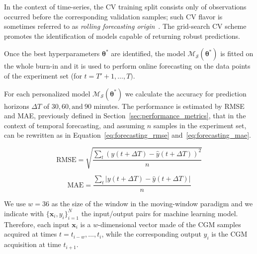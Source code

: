 In the context of time-series, the CV training split consists only of observations occurred before the corresponding validation samples; such CV flavor is sometimes referred to as {\em rolling forecasting origin}~\cite{tashman2000out}. The grid-search CV scheme promotes the identification of models capable of returning robust predictions. %

Once the best hyperparameters $\bm{\theta}^*$ are identified, the model $\mathcal{M}_\mathcal{S}(\bm{\theta}^*)$ is fitted on the whole burn-in and it is used to perform online forecasting on the data points of the experiment set (\ie for $t = T'+1, \dots, T)$.

For each personalized model $\mathcal{M}_\mathcal{S}(\bm{\theta}^*)$ we calculate the accuracy for prediction horizons $\Delta T$ of $30, 60, \text{and}~90$ minutes. The performance is estimated by  RMSE and MAE, previously defined in Section~\ref{sec:performance_metrics}, that in the context of temporal forecasting, and assuming $n$ samples in the experiment set, can be rewritten as in Equation~\eqref{eq:forecasting_rmse} and~\eqref{eq:forecasting_mae}.

\begin{equation} \label{eq:forecasting_rmse}
\text{RMSE} = \sqrt{\frac{\sum_t(y(t+\Delta T) - \hat{y}(t+\Delta T))^2}{n}}
\end{equation}

\begin{equation} \label{eq:forecasting_mae}
\text{MAE} = \frac{\sum_t|y(t+\Delta T) - \hat{y}(t+\Delta T)|}{n}
\end{equation}

We use $w=36$ as the size of the window in the moving-window paradigm and we  indicate with $\{\bm{x}_i, y_i\}_{i=1}^N$  the input/output pairs for machine learning model. 
Therefore, each input $\bm{x}_i$ is a $w$-dimensional vector made of the CGM samples acquired at times $t=t_{i-w},\dots,t_i$, while the corresponding output $y_i$ is the CGM acquisition at time $t_{i+1}$.






